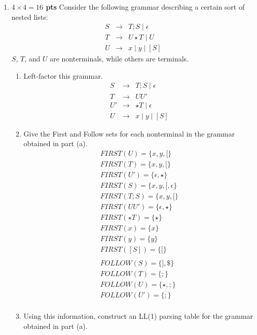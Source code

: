 \documentclass[10pt]{article}
\newcommand {\pts}[1]{{\bf #1 pts}}
\begin{document}
\begin{enumerate}
\newpage
\item \pts{$4\times 4 =16$} Consider the following grammar describing a certain sort of nested lists:
\[\begin{array}{cll}
S & \rightarrow & T;S \mid \epsilon \\
T & \rightarrow & U\star T \mid U \\
U & \rightarrow & x\mid y\mid [S]  
\end{array}\]
$S$, $T$, and $U$ are nonterminals, while others are terminals.
\begin{enumerate}
  \item Left-factor this grammar.
             \[\begin{array}{cll}
                S & \rightarrow & T;S \mid \epsilon \\
                T & \rightarrow & UU' \\
                U' & \rightarrow & \star T \mid \epsilon \\
                U & \rightarrow & x\mid y\mid [S]  
            \end{array}\]
  \item Give the First and Follow sets for each nonterminal in the grammar obtained in part (a).
            \[\begin{array}{cll}
              FIRST(U)=\{x,y,[\} \\
              FIRST(T)=\{x,y,[\} \\
              FIRST(U')=\{\epsilon,\star\} \\
              FIRST(S)=\{x,y,[,\epsilon\} \\
              FIRST(T;S)=\{x,y,[\} \\
              FIRST(UU')=\{\epsilon,\star\} \\
              FIRST(\star T)=\{\star\} \\
              FIRST(x)=\{x\} \\ 
              FIRST(y)=\{y\} \\ 
              FIRST([S])=\{[\} \\ \\ 
              FOLLOW(S)=\{],\$\} \\
              FOLLOW(T)=\{;\} \\
              FOLLOW(U)=\{\star,;\} \\
              FOLLOW(U')=\{;\} \\
            \end{array}\]
  \item Using this information, construct an LL(1) parsing table for the grammar obtained in part (a).

\end{enumerate}
\end{enumerate}
\end{document}
